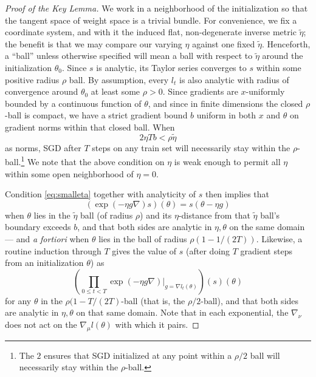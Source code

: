 \documentclass[openany, notitlepage, justified]{tufte-book}
\theoremstyle{plain}
\theoremstyle{definition}
\newcommand{\wrap}[1]{\left(#1\right)}
\begin{document}
        \begin{proof}[Proof of the Key Lemma]%
            We work in a neighborhood of the initialization so that the tangent
            space of weight space is a trivial bundle.  For convenience, we fix
            a  coordinate system, and with it the induced flat,
            non-degenerate inverse metric $\tilde\eta$; the benefit is that we
            may compare our varying $\eta$ against one fixed $\tilde\eta$.
            Henceforth, a ``ball'' unless otherwise specified will mean a ball
            with respect to $\tilde\eta$ around the initialization $\theta_0$.
            Since $s$ is analytic, its Taylor series converges to $s$ within
            some positive radius $\rho$ ball.  By assumption, every $l_t$ is
            also analytic with radius of convergence around $\theta_0$ at least
            some $\rho>0$.  Since gradients are $x$-uniformly
            bounded by a continuous function of $\theta$, and since in finite
            dimensions the closed $\rho$-ball is compact, we have a strict
            gradient bound $b$ uniform in both $x$ and $\theta$ on gradient
            norms within that closed ball.  When
            \begin{equation} \label{eq:smalleta}
                2 \eta T b < \rho \tilde\eta
            \end{equation}
            as norms, SGD after $T$ steps on any train set
            will necessarily stay within the $\rho$-ball.\footnote{
                The $2$ ensures that SGD initialized at
                any point within a $\rho/2$ ball will necessarily stay within
                the $\rho$-ball.
            } We note that the above condition on $\eta$ is weak enough to
            permit all $\eta$ within some open neighborhood of $\eta=0$.  

            Condition \ref{eq:smalleta} together with analyticity of $s$ then
            implies that
            $$
                \wrap{\exp(-\eta g \nabla) s}(\theta) = s(\theta - \eta g)
            $$
            when $\theta$ lies in the $\tilde\eta$ ball (of radius $\rho$) and
            its $\eta$-distance from that $\tilde\eta$ ball's boundary exceeds
            $b$, and that both sides are analytic in $\eta, \theta$ on the same
            domain --- and \emph{a fortiori} when $\theta$ lies in the ball of
            radius $\rho (1 - 1/(2T))$.  Likewise, a routine induction through
            $T$ gives the value of $s$ (after doing $T$ gradient steps from an
            initialization $\theta$) as
            $$
                \wrap{
                    \prod_{0\leq t<T}
                        \left.
                            \exp(-\eta g \nabla)
                        \right|_{g=\nabla l_t(\theta)}
                }
                (s)(\theta)
            $$
            for any $\theta$ in the $\rho (1-T/(2T)$-ball (that is, the
            $\rho/2$-ball), and that both sides are analytic in $\eta, \theta$
            on that same domain.  Note that in each exponential, the
            $\nabla_\nu$ does not act on the $\nabla_\mu l(\theta)$ with which
            it pairs.  


\end{proof}
\end{document}
